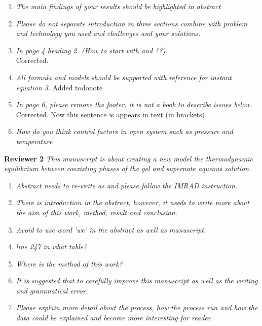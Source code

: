 \documentclass[12pt]{dinbrief}
\begin{document}
\begin{enumerate}
\item \textit{The main findings of your results should be highlighted in abstract} 

\item \textit{Please do not separate introduction in three sections combine with problem and technology you used and challenges and your solutions.}

\item \textit{In page 4 heading 2. (How to start with and ??)}.\\
Corrected.

\item \textit{All formula and models should be supported with reference for instant equation 3.}
Added todonote

\item \textit{In page 6, please remove the footer, it is not a book to describe issues below}.\\
Corrected. Now this sentence is appears in text (in brackets).


\item \textit{How do you think control factors in open system such as pressure and temperature}

\end{enumerate}


\textbf{Reviewer 2}
\textit{This manuscript is about creating a new model the thermodynamic equilibrium between coexisting phases of the gel and supernate aqueous solution.}
\begin{enumerate}

\item \textit{Abstract needs to re-write as and please follow the IMRAD instruction.}
\item \textit{There is introduction in the abstract, however, it needs to write more about the aim of this work, method, result and conclusion.}
\item \textit{Avoid to use word 'we' in the abstract as well as manuscript.}
\item \textit{line 247 in what table?}
\item \textit{Where is the method of this work?}
\item \textit{It is suggested that to carefully improve this manuscript as well as the writing and grammatical error.}
\item \textit{Please explain more detail about the process, how the process run and how the data could be explained and become more interesting for reader.}

\end{enumerate}
\end{document}
